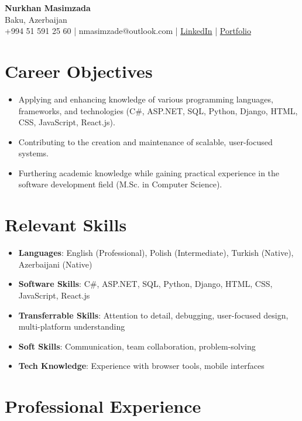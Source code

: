 \documentclass[11pt,a4paper]{article}
\begin{document}
\begin{center}
    {\Large \textbf{Nurkhan Masimzada}} \\
    Baku, Azerbaijan \\
    +994 51 591 25 60 | nmasimzade@outlook.com | \href{https://www.linkedin.com/in/nurxanmasimzade/}{LinkedIn} | \href{https://nurkhanmasimzada.site}{Portfolio}
\end{center}

\section*{Career Objectives}
\begin{itemize}[leftmargin=*]
    \item Applying and enhancing knowledge of various programming languages, frameworks, and technologies (C\#, ASP.NET, SQL, Python, Django, HTML, CSS, JavaScript, React.js).
    \item Contributing to the creation and maintenance of scalable, user-focused systems.
    \item Furthering academic knowledge while gaining practical experience in the software development field (M.Sc. in Computer Science).
\end{itemize}

\section*{Relevant Skills}
\begin{itemize}[leftmargin=*]
    \item \textbf{Languages}: English (Professional), Polish (Intermediate), Turkish (Native),  Azerbaijani (Native)
    \item \textbf{Software Skills}: C\#, ASP.NET, SQL, Python, Django, HTML, CSS, JavaScript, React.js
    \item \textbf{Transferrable Skills}: Attention to detail, debugging, user-focused design, multi-platform understanding
    \item \textbf{Soft Skills}: Communication, team collaboration, problem-solving
    \item \textbf{Tech Knowledge}: Experience with browser tools, mobile interfaces
\end{itemize}

\section*{Professional Experience}
\end{document}
